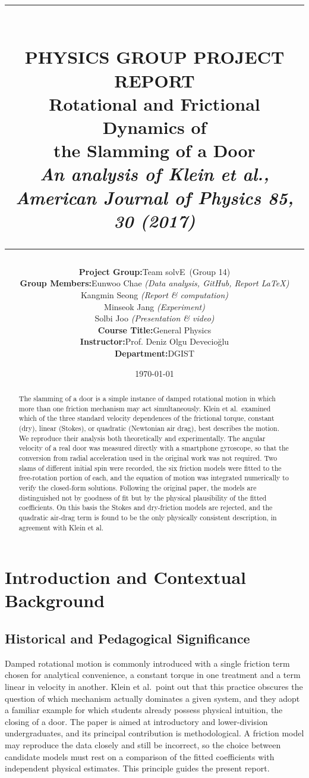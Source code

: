 \documentclass[11pt,letterpaper]{article}
\title{\vspace{-1.5in}
\rule{\linewidth}{1.5pt} \\ \vspace{4mm}
\large\textbf{PHYSICS GROUP PROJECT REPORT} \\ \vspace{2mm}
\Large\textbf{Rotational and Frictional Dynamics of\\ the Slamming of a Door}
\\ \vspace{4mm}
\large\textit{An analysis of Klein et al., American Journal of Physics 85, 30 (2017)} \\
\rule{\linewidth}{1.5pt}}
\author{
\begin{tabular}{r @{\quad} l}
\textbf{Project Group:} & Team solvE \,(Group 14) \\[1ex]
\textbf{Group Members:} & Eunwoo Chae \textit{(Data analysis, GitHub, Report \LaTeX)} \\
 & Kangmin Seong \textit{(Report \& computation)} \\
 & Minseok Jang \textit{(Experiment)} \\
 & Solbi Joo \textit{(Presentation \& video)} \\[1ex]
\textbf{Course Title:}  & General Physics \\
\textbf{Instructor:}    & Prof. Deniz Olgu Devecio\u{g}lu \\
\textbf{Department:}    & DGIST
\end{tabular}}
\date{\today}
\begin{document}
\maketitle
\begin{abstract}
The slamming of a door is a simple instance of damped rotational motion in which more than
one friction mechanism may act simultaneously. Klein et al.\ examined which of the three
standard velocity dependences of the frictional torque, constant (dry), linear (Stokes), or
quadratic (Newtonian air drag), best describes the motion. We reproduce their analysis both
theoretically and experimentally. The angular velocity of a real door was measured directly
with a smartphone gyroscope, so that the conversion from radial acceleration used in the
original work was not required. Two slams of different initial spin were recorded, the six
friction models were fitted to the free-rotation portion of each, and the equation of motion
was integrated numerically to verify the closed-form solutions. Following the original
paper, the models are distinguished not by goodness of fit but by the physical plausibility
of the fitted coefficients. On this basis the Stokes and dry-friction models are rejected,
and the quadratic air-drag term is found to be the only physically consistent description,
in agreement with Klein et al.
\end{abstract}
\newpage
\tableofcontents
\newpage

\section{Introduction and Contextual Background}
\subsection{Historical and Pedagogical Significance}
Damped rotational motion is commonly introduced with a single friction term chosen for
analytical convenience, a constant torque in one treatment and a term linear in velocity in
another. Klein et al.\ point out that this practice obscures the question of which mechanism
actually dominates a given system, and they adopt a familiar example for which students
already possess physical intuition, the closing of a door. The paper is aimed at
introductory and lower-division undergraduates, and its principal contribution is
methodological. A friction model may reproduce the data closely and still be incorrect, so
the choice between candidate models must rest on a comparison of the fitted coefficients
with independent physical estimates. This principle guides the present report.
\end{document}
